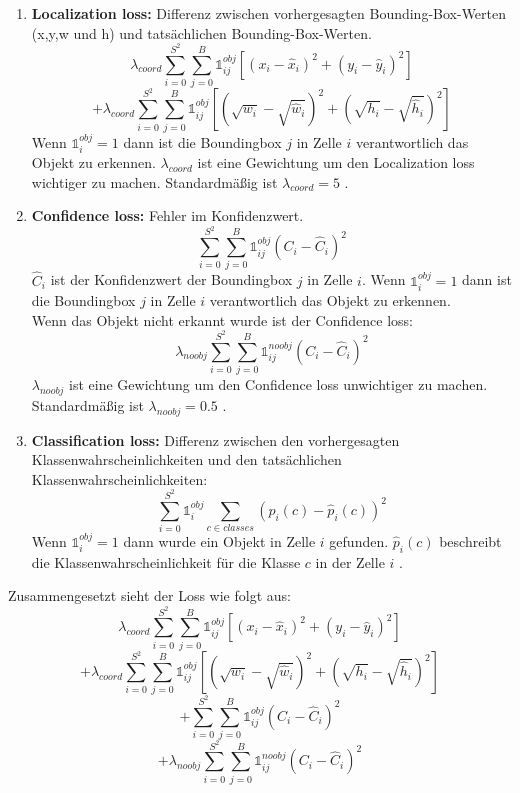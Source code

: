 \documentclass[conference]{IEEEtran}
\begin{document}
	\begin{enumerate}
		\item \textbf{Localization loss:} Differenz zwischen vorhergesagten Bounding-Box-Werten (x,y,w und h) und tatsächlichen Bounding-Box-Werten.
		\[ \lambda_{coord} \sum_{i=0}^{S^2}\sum_{j=0}^{B} \mathbb{1}_{i j}^{obj} [(x_i - \hat{x}_i )^2 + (y_i - \hat{y}_i )^2] \]
		\[ + \lambda_{coord} \sum_{i=0}^{S^2}\sum_{j=0}^{B} \mathbb{1}_{i j}^{obj} [(\sqrt{w_i} - \sqrt{\hat{w}_i} )^2 + (\sqrt{h_i} - \sqrt{\hat{h}_i} )^2] \]
		Wenn $\mathbb{1}_{i}^{obj} = 1$ dann ist die Boundingbox $j$ in Zelle $i$ verantwortlich das Objekt zu erkennen. $\lambda_{coord}$ ist eine Gewichtung um den Localization loss wichtiger zu machen. Standardmäßig ist $\lambda_{coord} = 5$ \cite{b5}.
		
		\item \textbf{Confidence loss:} Fehler im Konfidenzwert.
		\[  \sum_{i=0}^{S^2}\sum_{j=0}^{B} \mathbb{1}_{i j}^{obj} (C_i - \hat{C}_i)^2 \]
		$\hat{C}_i$ ist der Konfidenzwert der Boundingbox $j$ in Zelle $i$. Wenn $\mathbb{1}_{i}^{obj} = 1$ dann ist die Boundingbox $j$ in Zelle $i$ verantwortlich das Objekt zu erkennen.\\
		Wenn das Objekt nicht erkannt wurde ist der Confidence loss:
		\[  \lambda_{noobj} \sum_{i=0}^{S^2}\sum_{j=0}^{B} \mathbb{1}_{i j}^{noobj} (C_i - \hat{C}_i)^2 \]
		$\lambda_{noobj}$ ist eine Gewichtung um den Confidence loss unwichtiger zu machen. Standardmäßig ist $\lambda_{noobj} = 0.5$ \cite{b5}.
		
		\item \textbf{Classification loss:} Differenz zwischen den vorhergesagten Klassenwahrscheinlichkeiten und den tatsächlichen Klassenwahrscheinlichkeiten:
		\[ \sum_{i=0}^{S^2} \mathbb{1}_{i}^{obj} \sum_{c \in classes} (p_i(c) - \hat{p}_i(c))^2 \]
		Wenn $\mathbb{1}_{i}^{obj} = 1$ dann wurde ein Objekt in Zelle $i$ gefunden.
		$\hat{p}_i(c)$ beschreibt die Klassenwahrscheinlichkeit für die Klasse $c$ in der Zelle $i$ \cite{b5}.
	\end{enumerate}
	Zusammengesetzt sieht der Loss wie folgt aus:
	\[ \lambda_{coord} \sum_{i=0}^{S^2}\sum_{j=0}^{B} \mathbb{1}_{i j}^{obj} [(x_i - \hat{x}_i )^2 + (y_i - \hat{y}_i )^2] \]
	\[ + \lambda_{coord} \sum_{i=0}^{S^2}\sum_{j=0}^{B} \mathbb{1}_{i j}^{obj} [(\sqrt{w_i} - \sqrt{\hat{w}_i} )^2 + (\sqrt{h_i} - \sqrt{\hat{h}_i} )^2] \]
	\[ + \sum_{i=0}^{S^2}\sum_{j=0}^{B} \mathbb{1}_{i j}^{obj} (C_i - \hat{C}_i)^2 \]
	\[ + \lambda_{noobj} \sum_{i=0}^{S^2}\sum_{j=0}^{B} \mathbb{1}_{i j}^{noobj} (C_i - \hat{C}_i)^2 \]
\end{document}
